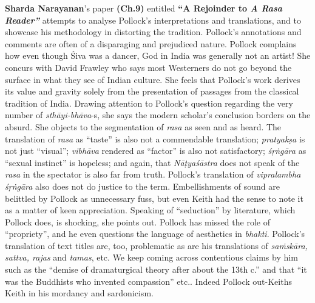 \textbf{Sharda Narayanan}’s paper \textbf{(Ch.9)} entitled \textbf{“A Rejoinder to \textit{A Rasa Reader”}} attempts to analyse Pollock’s interpretations and translations, and to showcase his methodology in distorting the tradition. Pollock’s annotations and comments are often of a disparaging and prejudiced nature. Pollock complains how even though Śiva was a dancer, God in India was generally not an artist! She concurs with David Frawley who says most Westerners do not go beyond the surface in what they see of Indian culture. She feels that Pollock’s work derives its value and gravity solely from the presentation of passages from the classical tradition of India. Drawing attention to Pollock’s question regarding the very number of \textit{sthāyi-bhāva}-s, she says the modern scholar’s conclusion borders on the absurd. She objects to the segmentation of \textit{rasa} as seen and as heard. The translation of \textit{rasa} as “taste” is also not a commendable translation; \textit{pratyakṣa} is not just “visual”; \textit{vibhāva} rendered as “factor” is also not satisfactory; \textit{śṛṅgāra} as “sexual instinct” is hopeless; and again, that \textit{Nāṭyaśāstra} does not speak of the \textit{rasa} in the spectator is also far from truth. Pollock’s translation of \textit{vipralambha śṛṅgāra} also does not do justice to the term. Embellishments of sound are belittled by Pollock as unnecessary fuss, but even Keith had the sense to note it as a matter of keen appreciation. Speaking of “seduction” by literature, which Pollock does, is shocking, she points out. Pollock has missed the role of “propriety”, and he even questions the language of aesthetics in \textit{bhakti}. Pollock’s translation of text titles are, too, problematic as are his translations of \textit{saṁskāra, sattva, rajas} and \textit{tamas}, etc. We keep coming across contentious claims by him such as the “demise of dramaturgical theory after about the 13th c.” and that “it was the Buddhists who invented compassion” etc.. Indeed Pollock out-Keiths Keith in his mordancy and sardonicism.

